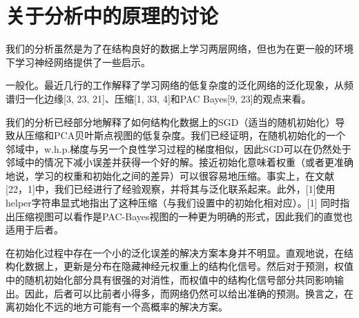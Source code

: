 \section{关于分析中的原理的讨论}
我们的分析虽然是为了在结构良好的数据上学习两层网络，但也为在更一般的环境下学习神经网络提供了一些启示。
\par
一般化。最近几行的工作解释了学习网络的低复杂度的泛化网络的泛化现象，从频谱归一化边缘[3, 23, 21]、压缩[1, 33, 4]和PAC Bayes[9, 23]的观点来看。
\par
我们的分析已经部分地解释了如何结构化数据上的SGD（适当的随机初始化）导致从压缩和PCA贝叶斯点视图的低复杂度。我们已经证明，在随机初始化的一个邻域中，w.h.p.梯度与另一个良性学习过程的梯度相似，因此SGD可以在仍然处于邻域中的情况下减小误差并获得一个好的解。接近初始化意味着权重（或者更准确地说，学习的权重和初始化之间的差异）可以很容易地压缩。事实上，在文献[22，1]中，我们已经进行了经验观察，并将其与泛化联系起来。此外，[1]使用helper字符串显式地指出了这种压缩（与我们设置中的初始化相对应）。[1] 同时指出压缩视图可以看作是PAC-Bayes视图的一种更为明确的形式，因此我们的直觉也适用于后者。
\par
在初始化过程中存在一个小的泛化误差的解决方案本身并不明显。直观地说，在结构化数据上，更新是分布在隐藏神经元权重上的结构化信号。然后对于预测，权值中的随机初始化部分具有很强的对消性，而权值中的结构化信号部分共同影响输出。因此，后者可以比前者小得多，而网络仍然可以给出准确的预测。换言之，在离初始化不远的地方可能有一个高概率的解决方案。

